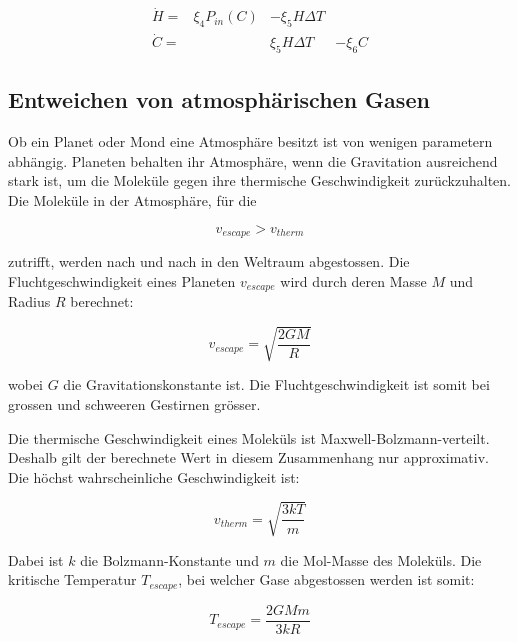 \begin{refsection}
\begin{equation}
	\begin{matrix}			
		\dot{H} = & \xi_4 P_{in}(C) & - \xi_5 H \Delta T & \\
		\dot{C} = &                 &   \xi_5 H \Delta T & - \xi_6 C
	\end{matrix}	
\end{equation}


\subsection{Entweichen von atmosphärischen Gasen}

Ob ein Planet oder Mond eine Atmosphäre besitzt ist von wenigen parametern abhängig. Planeten behalten ihr Atmosphäre, wenn die Gravitation ausreichend stark ist, um die Moleküle gegen ihre thermische Geschwindigkeit zurückzuhalten.
Die Moleküle in der Atmosphäre, für die


\begin{equation}
v_{escape} > v_{therm}
\end{equation}

zutrifft, werden nach und nach in den Weltraum abgestossen.
Die Fluchtgeschwindigkeit eines Planeten $v_{escape}$ wird durch deren Masse $M$ und Radius $R$ berechnet: 

\begin{equation}
v_{escape} = \sqrt{\frac{2GM}{R}}
\end{equation}

wobei $G$ die Gravitationskonstante ist. Die Fluchtgeschwindigkeit ist somit bei grossen und schweeren Gestirnen grösser.

Die thermische Geschwindigkeit eines Moleküls ist Maxwell-Bolzmann-verteilt. Deshalb gilt der berechnete Wert in diesem Zusammenhang nur approximativ. Die höchst wahrscheinliche Geschwindigkeit ist: 

\begin{equation}
v_{therm} = \sqrt{\frac{3kT}{m}}
\end{equation}

Dabei ist $k$ die Bolzmann-Konstante und $m$ die Mol-Masse des Moleküls. Die kritische Temperatur $T_{escape}$, bei welcher Gase abgestossen werden ist somit:

\begin{equation}
T_{escape} = \frac{2GMm}{3kR}
\end{equation}


\end{refsection}
